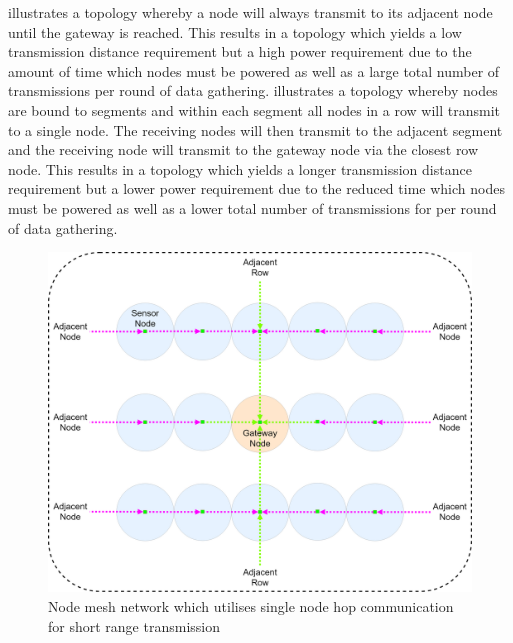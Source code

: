 \documentclass[10pt,twocolumn]{witseiepaper}
\begin{document}
			 illustrates a topology whereby a node will always transmit to its adjacent node until the gateway is reached. This results in a topology which yields a low transmission distance requirement but a high power requirement due to the amount of time which nodes must be powered as well as a large total number of transmissions per round of data gathering.  illustrates a topology whereby nodes are bound to segments and within each segment all nodes in a row will transmit to a single node. The receiving nodes will then transmit to the adjacent segment and the receiving node will transmit to the gateway node via the closest row node. This results in a topology which yields a longer transmission distance requirement but a lower power requirement due to the reduced time which nodes must be powered as well as a lower total number of transmissions for per round of data gathering.
			
			\begin{figure}
				\centering
				\includegraphics[width=1\columnwidth]{media/hop-mesh.png}
				\vspace{1em}
				\caption{Node mesh network which utilises single node hop communication for short range transmission}
				\raggedright
				\label{fig:single}
			\end{figure}
		
\end{document}
